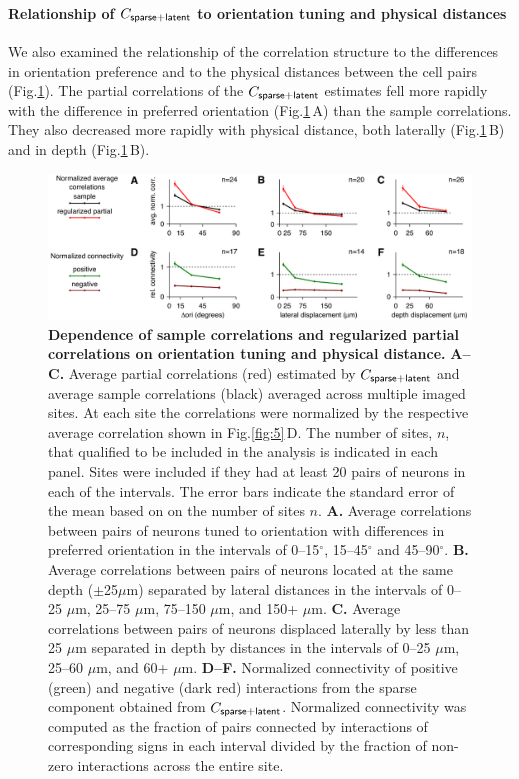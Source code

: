 \documentclass[10pt]{article}
\newcommand{\figref}[2]{Fig.\;\ref{fig:#1}\,#2}
\begin{document}
\paragraph{Relationship of $C_{\sf sparse+latent}$ to orientation tuning and physical distances}

We also examined the relationship of the correlation structure to the differences in orientation preference and to the physical distances between the cell pairs (Fig.\;\ref{fig:6}).  The partial correlations of the $C_{\sf sparse+latent}$ estimates fell more rapidly with the difference in preferred orientation (\figref{6}{A}) than the sample correlations. They also decreased more rapidly with physical distance, both laterally  (\figref{6}{B}) and in depth (\figref{6}{B}). 

\begin{figure}[!ht]
    \begin{center}
        \includegraphics{./figures/Figure06.pdf}
    \end{center}
    \caption{{\bf Dependence of sample correlations and regularized partial correlations on orientation tuning and physical distance.}
    {\bf A--C.} Average partial correlations (red) estimated by $C_{\sf sparse+latent}$ and average sample correlations (black) averaged across multiple imaged sites. At each site the correlations were normalized by the respective average correlation shown in \figref{5}{D}.  The number of sites, $n$, that qualified to be included in the analysis is indicated in each panel. Sites were included if they had at least 20 pairs of neurons in each of the intervals. The error bars indicate the standard error of the mean based on on the number of sites $n$.
    {\bf A.} Average correlations between pairs of neurons tuned to orientation with differences in preferred orientation in the intervals of 0--15$^\circ$, 15--45$^\circ$ and 45--90$^\circ$. 
    {\bf B.} Average correlations between pairs of neurons located at the same depth ($\pm$25$\mu$m) separated by lateral distances in the intervals of 0--25 $\mu$m, 25--75 $\mu$m, 75--150 $\mu$m, and 150+ $\mu$m.
    {\bf C.} Average correlations between pairs of neurons displaced laterally by less than 25 $\mu$m separated in depth by distances in the intervals of 0--25 $\mu$m, 25--60 $\mu$m, and 60+ $\mu$m.
    {\bf D--F.} Normalized connectivity of positive (green) and negative (dark red) interactions from the sparse component obtained from $C_{\sf sparse+latent}$. Normalized connectivity was computed as the fraction of pairs connected by interactions of corresponding signs in each interval divided by the fraction of non-zero interactions across the entire site. }
\label{fig:6}
\end{figure}
\end{document}
